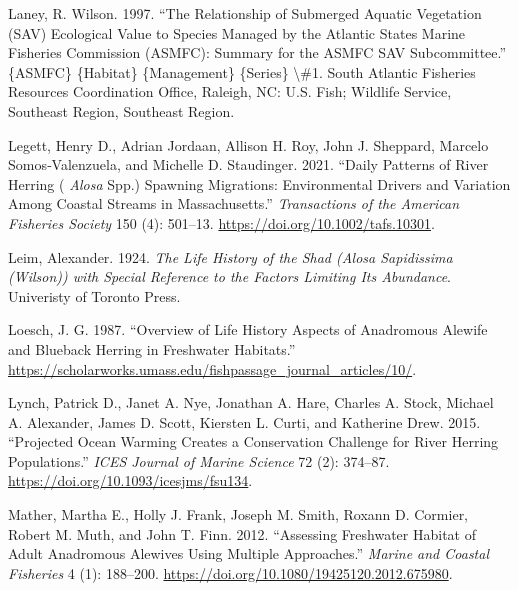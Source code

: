 \documentclass[
]{book}
\newlength{\cslhangindent}
\newlength{\cslentryspacingunit} %
\newenvironment{CSLReferences}[2] %
 {%
  \setlength{\parindent}{0pt}
  \ifodd #1
  \let\oldpar\par
  \def\par{\hangindent=\cslhangindent\oldpar}
  \fi
  \setlength{\parskip}{#2\cslentryspacingunit}
 }%
 {}
\begin{document}
\begin{CSLReferences}{1}{0}
\leavevmode{}%
Laney, R. Wilson. 1997. {``The {Relationship} of {Submerged} {Aquatic} {Vegetation} ({SAV}) {Ecological} {Value} to {Species} {Managed} by the {Atlantic} {States} {Marine} {Fisheries} {Commission} ({ASMFC}): {Summary} for the {ASMFC} {SAV} {Subcommittee}.''} \{ASMFC\} \{Habitat\} \{Management\} \{Series\} \textbackslash\#1. South Atlantic Fisheries Resources Coordination Office, Raleigh, NC: U.S. Fish; Wildlife Service, Southeast Region, Southeast Region.

\leavevmode{}%
Legett, Henry D., Adrian Jordaan, Allison H. Roy, John J. Sheppard, Marcelo Somos‐Valenzuela, and Michelle D. Staudinger. 2021. {``Daily {Patterns} of {River} {Herring} ( \emph{Alosa} Spp.) {Spawning} {Migrations}: {Environmental} {Drivers} and {Variation} Among {Coastal} {Streams} in {Massachusetts}.''} \emph{Transactions of the American Fisheries Society} 150 (4): 501--13. \url{https://doi.org/10.1002/tafs.10301}.

\leavevmode{}%
Leim, Alexander. 1924. \emph{The {Life} {History} of the {Shad} ({Alosa} {Sapidissima} ({Wilson})) with {Special} {Reference} to the {Factors} {Limiting} {Its} {Abundance}}. Univeristy of Toronto Press.

\leavevmode{}%
Loesch, J. G. 1987. {``Overview of {Life} {History} {Aspects} of {Anadromous} {Alewife} and {Blueback} {Herring} in {Freshwater} {Habitats}.''} \url{https://scholarworks.umass.edu/fishpassage_journal_articles/10/}.

\leavevmode{}%
Lynch, Patrick D., Janet A. Nye, Jonathan A. Hare, Charles A. Stock, Michael A. Alexander, James D. Scott, Kiersten L. Curti, and Katherine Drew. 2015. {``Projected Ocean Warming Creates a Conservation Challenge for River Herring Populations.''} \emph{ICES Journal of Marine Science} 72 (2): 374--87. \url{https://doi.org/10.1093/icesjms/fsu134}.

\leavevmode{}%
Mather, Martha E., Holly J. Frank, Joseph M. Smith, Roxann D. Cormier, Robert M. Muth, and John T. Finn. 2012. {``Assessing {Freshwater} {Habitat} of {Adult} {Anadromous} {Alewives} {Using} {Multiple} {Approaches}.''} \emph{Marine and Coastal Fisheries} 4 (1): 188--200. \url{https://doi.org/10.1080/19425120.2012.675980}.


\end{CSLReferences}
\end{document}
